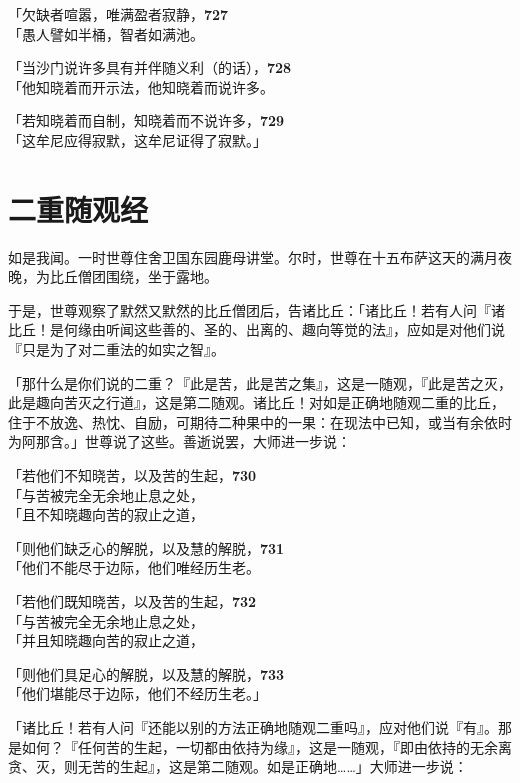 「欠缺者喧嚣，唯满盈者寂静，\hfill{\grayfootnotesize \textbf{727}} \\
「愚人譬如半桶，智者如满池。


「当沙门说许多具有并伴随义利（的话），\hfill{\grayfootnotesize \textbf{728}} \\
「他知晓着而开示法，他知晓着而说许多。


「若知晓着而自制，知晓着而不说许多，\hfill{\grayfootnotesize \textbf{729}} \\
「这牟尼应得寂默，这牟尼证得了寂默。」


\section{二重随观经}

如是我闻。一时世尊住舍卫国东园鹿母讲堂。尔时，世尊在十五布萨这天的满月夜晚，为比丘僧团围绕，坐于露地。


于是，世尊观察了默然又默然的比丘僧团后，告诸比丘：「诸比丘！若有人问『诸比丘！是何缘由听闻这些善的、圣的、出离的、趣向等觉的法』，应如是对他们说『只是为了对二重法的如实之智』。


「那什么是你们说的二重？『此是苦，此是苦之集』，这是一随观，『此是苦之灭，此是趣向苦灭之行道』，这是第二随观。诸比丘！对如是正确地随观二重的比丘，住于不放逸、热忱、自励，可期待二种果中的一果：在现法中已知，或当有余依时为阿那含。」世尊说了这些。善逝说罢，大师进一步说：


「若他们不知晓苦，以及苦的生起，\hfill{\grayfootnotesize \textbf{730}} \\
「与苦被完全无余地止息之处，\\
「且不知晓趣向苦的寂止之道，


「则他们缺乏心的解脱，以及慧的解脱，\hfill{\grayfootnotesize \textbf{731}} \\
「他们不能尽于边际，他们唯经历生老。


「若他们既知晓苦，以及苦的生起，\hfill{\grayfootnotesize \textbf{732}} \\
「与苦被完全无余地止息之处，\\
「并且知晓趣向苦的寂止之道，

「则他们具足心的解脱，以及慧的解脱，\hfill{\grayfootnotesize \textbf{733}} \\
「他们堪能尽于边际，他们不经历生老。」


「诸比丘！若有人问『还能以别的方法正确地随观二重吗』，应对他们说『有』。那是如何？『任何苦的生起，一切都由依持为缘』，这是一随观，『即由依持的无余离贪、灭，则无苦的生起』，这是第二随观。如是正确地……」大师进一步说：


